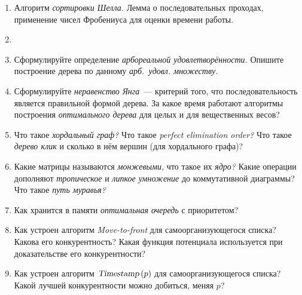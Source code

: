 \documentclass[a4paper,10pt]{article}
\begin{document}
\begin{enumerate}[leftmargin=*,itemsep=-0.1mm]
\item Алгоритм {\sl сортировки Шелла.} Лемма о последовательных проходах, применение чисел Фробениуса для оценки времени работы.

\item \underline{\hspace{10cm}}

\item Сформулируйте определение {\sl арбореальной удовлетворённости.} Опишите построение дерева по данному {\sl арб.~удовл. множеству.}

\item Сформулируйте {\sl неравенство Янга}~— критерий того, что последовательность является правильной формой дерева. За какое время работают алгоритмы построения {\sl оптимального дерева} для целых и для вещественных весов?

\item Что такое {\sl хордальный граф?} Что такое {\sl perfect elimination order?} Что такое {\sl дерево клик} и сколько в нём вершин (для хордального графа)?

\item Какие матрицы называются {\sl монжевыми,} что такое их {\sl ядро?} Какие операции дополняют {\sl тропическое} и {\sl липкое умножение} до коммутативной диаграммы? Что такое {\sl путь муравья?}

\item Как хранится в памяти {\sl оптимальная очередь} с приоритетом?

\item Как устроен алгоритм {\sl Move-to-front} для самоорганизующегося списка? Какова его конкурентность? Какая функция потенциала используется при доказательстве его конкурентности?

\item Как устроен алгоритм \(\text{\sl Timestamp}\,(p)\) для самоорганизующегося списка? Какой лучшей конкурентности можно добиться, меняя \(p\)?
\end{enumerate}
\end{document}
